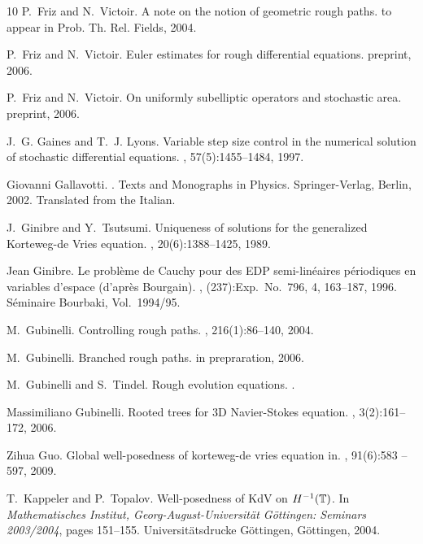 \documentclass[a4paper,11pt,reqno]{article}
\begin{document}
\begin{thebibliography}{10}
P.~Friz and N.~Victoir.
\newblock A note on the notion of geometric rough paths.
\newblock to appear in Prob. Th. Rel. Fields, 2004.

P.~Friz and N.~Victoir.
\newblock Euler estimates for rough differential equations.
\newblock preprint, 2006.

P.~Friz and N.~Victoir.
\newblock On uniformly subelliptic operators and stochastic area.
\newblock preprint, 2006.

J.~G. Gaines and T.~J. Lyons.
\newblock Variable step size control in the numerical solution of stochastic
  differential equations.
, 57(5):1455--1484, 1997.

Giovanni Gallavotti.
.
\newblock Texts and Monographs in Physics. Springer-Verlag, Berlin, 2002.
\newblock Translated from the Italian.

J.~Ginibre and Y.~Tsutsumi.
\newblock Uniqueness of solutions for the generalized {K}orteweg-de {V}ries
  equation.
, 20(6):1388--1425, 1989.

Jean Ginibre.
\newblock Le probl\`eme de {C}auchy pour des {EDP} semi-lin\'eaires
  p\'eriodiques en variables d'espace (d'apr\`es {B}ourgain).
, (237):Exp.\ No.\ 796, 4, 163--187, 1996.
\newblock S\'eminaire Bourbaki, Vol.\ 1994/95.

M.~Gubinelli.
\newblock Controlling rough paths.
, 216(1):86--140, 2004.

M.~Gubinelli.
\newblock Branched rough paths.
\newblock in prepraration, 2006.

M.~Gubinelli and S.~Tindel.
\newblock Rough evolution equations.
.

Massimiliano Gubinelli.
\newblock Rooted trees for 3{D} {N}avier-{S}tokes equation.
, 3(2):161--172, 2006.

Zihua Guo.
\newblock Global well-posedness of korteweg-de vries equation in.
, 91(6):583
  -- 597, 2009.

T.~Kappeler and P.~Topalov.
\newblock Well-posedness of {K}d{V} on {$H\sp {-1}(\Bbb T)$}.
\newblock In {\em Mathematisches Institut, Georg-August-Universit\"at
  G\"ottingen: Seminars 2003/2004}, pages 151--155. Universit\"atsdrucke
  G\"ottingen, G\"ottingen, 2004.


\end{thebibliography}
\end{document}
